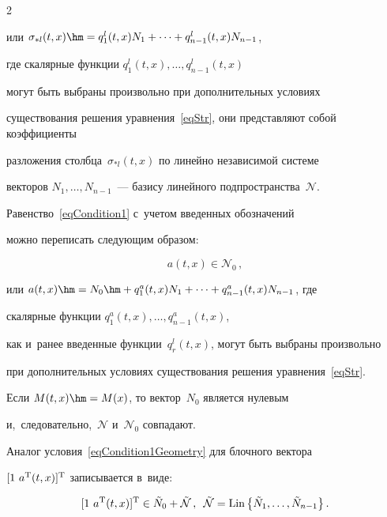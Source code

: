 \begin{multicols}{2}
\begin{equation}
\end{equation}

или $\sigma_{* l}(t,x) \hm= q_1^l(t,x) N_1 + \cdots + q_{n-1}^l(t,x) N_{n-1}$, 

где скалярные функции $q_1^l(t,x), \ldots, q_{n-1}^l(t,x)$ 

могут быть выбраны произвольно при дополнительных условиях 

существования решения уравнения~\eqref{eqStr}, они представляют собой коэффициенты 

разложения столбца~$\sigma_{* l}(t,x)$ по линейно независимой сис\-те\-ме 

векторов $N_1, \dots, N_{n-1}$~--- базису линейного подпространства~$\mathcal{N}$.



Равенство~\eqref{eqCondition1} с~учетом введенных обозначений 

можно переписать следующим образом:

\begin{equation}

\label{eqCondition1Geometry}

  a(t,x) \in \mathcal{N}_0\,,

\end{equation}

или $a(t,x) \hm= N_0 \hm+ q_1^a(t,x) N_1 + \cdots + q_{n-1}^a(t,x) N_{n-1}$, где 

скалярные функции $q_1^a(t,x), \ldots, q_{n-1}^a(t,x)$, 

как и~ранее введенные функции~$q_r^l(t,x)$, могут быть выбраны произвольно 

при дополнительных условиях существования решения уравнения~\eqref{eqStr}. 

Если $M(t,x) \hm= M(x)$, то вектор~$N_0$ является нулевым 

и,~следовательно,~$\mathcal{N}$ и~$\mathcal{N}_0$ совпадают.



Аналог условия~\eqref{eqCondition1Geometry} для блочного вектора 

$[ 1 \  a^{{\mathrm{T}}}(t,x) ]^{{\mathrm{T}}}$ записывается в~виде:

$$

  [  1 \  a^\trans(t,x)]^\trans \in \tilde N_0 + \tilde{\mathcal{N}}\,,\enskip

  \tilde{\mathcal{N}} = \mathrm{Lin} \left\{ \tilde{N}_1,\dots,\tilde{N}_{n-1} \right\}.

$$




\end{multicols}
